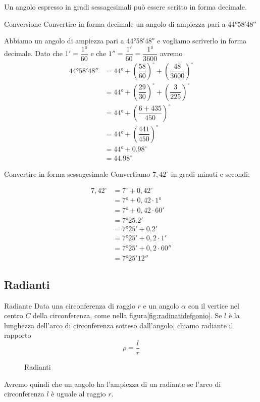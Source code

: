 Un angolo espresso in gradi sessagesimali può essere scritto in forma decimale. 
\begin{esempiot}{Conversione}{}
Convertire in forma decimale un angolo di ampiezza pari a \ang{44;58;48}
\end{esempiot}
 Abbiamo un angolo di ampiezza pari a \ang{44;58;48} e vogliamo
 scriverlo in forma decimale. Dato che $\ang{;1;}=\dfrac{\ang{1}}{60}$ e che $\ang{;;1}=\dfrac{\ang{;1;}}{60}=\dfrac{\ang{1}}{3600}$  avremo
\begin{align*}
	\ang{44;58;48}&=\ang{44}+\left(\dfrac{58}{60}\right)^{\circ}+\left(\dfrac{48}{3600} \right)^{\circ}\\
	&=\ang{44}+\left(\dfrac{29}{30}\right)^{\circ}+\left(\dfrac{3}{225} \right)^{\circ}\\
	&=\ang{44}+\left(\dfrac{6+435}{450} \right)^{\circ}\\
	&=\ang{44}+\left(\dfrac{441}{450} \right)^{\circ}\\
	&=\ang{44}+\num{0,98}^{\circ}\\
	&=\num{44,98}^{\circ}
\end{align*}
\begin{esempiot}{Convertire in forma sessagesimale}{}
Convertiamo $7,42^{\circ}$ in gradi minuti e secondi:
\end{esempiot}
\begin{align*}
	7,42^{\circ}&=7^{\circ}+0,42^{\circ}\\
	&=\ang{7}+0,42\cdot \ang{1}\\
	&=\ang{7}+0,42\cdot \ang{;60;}\\
	&=\ang{7;25,2;}\\
	&=\ang{7;25;}+\ang{;0,2;}\\
	&=\ang{7;25;}+0,2\cdot\ang{;1;}\\
	&=\ang{7;25;}+0,2\cdot\ang{;;60}\\
	&=\ang{7;25;12}
\end{align*} 

\subsection{Radianti}
\begin{definizionet}{Radiante}{}
Data una circonferenza di raggio $r$ e  un angolo $\alpha$ con il vertice nel centro $C$ della circonferenza, come nella figura\nobs\vref{fig:radinatidefgonio}. Se $l$ è la lunghezza dell'arco di circonferenza sotteso dall'angolo, chiamo radiante il rapporto \[\rho=\dfrac{l}{r} \]
\end{definizionet}
\begin{figure}
	\centering
	
	\caption{Radianti}
	\label{fig:radinatidefgonio}
\end{figure}
Avremo quindi che un angolo ha l'ampiezza di un radiante se l'arco di circonferenza $l$ è uguale al raggio $r$.

